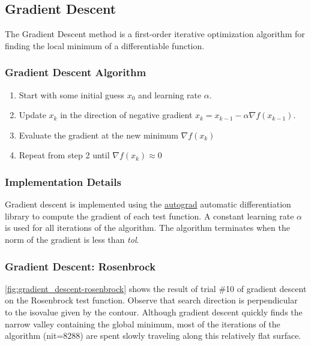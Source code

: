 \documentclass{vgtc}                          %
\begin{document}
\subsection{Gradient Descent}

The Gradient Descent method \cite{Kochenderfer:2019} is a first-order iterative optimization algorithm for finding the local minimum of a differentiable function.

\subsubsection{Gradient Descent Algorithm}

\begin{enumerate}
\item Start with some initial guess $x_0$ and learning rate $\alpha$.
\item Update $x_k$ in the direction of negative gradient $x_k = x_{k-1} - \alpha \nabla f(x_{k-1})$.
\item Evaluate the gradient at the new minimum $\nabla f(x_k)$
\item Repeat from step 2 until $\nabla f(x_k) \approx 0$
\end{enumerate}

\subsubsection{Implementation Details}
Gradient descent is implemented using the \href{https://autograd.readthedocs.io/en/latest/index.html}{autograd} automatic differentiation library to compute the gradient of each test function.  A constant learning rate $\alpha$ is used for all iterations of the algorithm.  The algorithm terminates when the norm of the gradient is less than \emph{tol}.

\subsubsection{Gradient Descent: Rosenbrock}

\autoref{fig:gradient_descent-rosenbrock} shows the result of trial \#10 of gradient descent on the Rosenbrock test function. Observe that search direction is perpendicular to the isovalue given by the contour. Although gradient descent quickly finds the narrow valley containing the global minimum, most of the iterations of the algorithm (nit=8288) are spent slowly traveling along this relatively flat surface.
\end{document}
